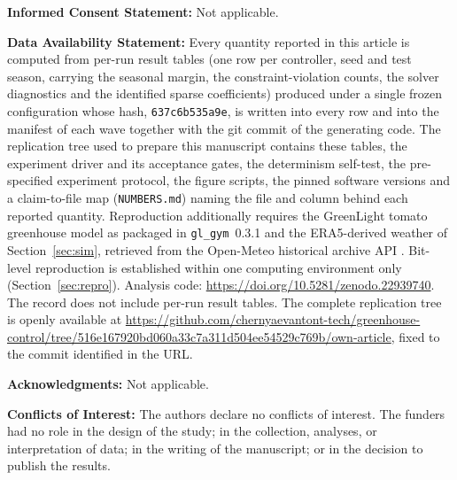 \noindent\textbf{Informed Consent Statement:} Not applicable.

\noindent\textbf{Data Availability Statement:}
Every quantity reported in this article is computed from per-run result tables (one
row per controller, seed and test season, carrying the seasonal margin, the
constraint-violation counts, the solver diagnostics and the identified sparse
coefficients) produced under a single frozen configuration whose hash,
\texttt{637c6b535a9e}, is written into every row and into the manifest of each wave
together with the git commit of the generating code. The replication tree used to prepare this manuscript
contains these tables, the experiment driver and its acceptance gates, the determinism
self-test, the pre-specified experiment protocol, the figure scripts, the pinned software
versions and a claim-to-file map (\texttt{NUMBERS.md}) naming the file and column behind
each reported quantity. Reproduction additionally requires the GreenLight tomato
greenhouse model as packaged in \texttt{gl\_gym}~0.3.1 \cite{katzin2020,vanlaatum2025}
and the ERA5-derived weather of Section~\ref{sec:sim}, retrieved from the Open-Meteo
historical archive API \cite{hersbach2020,openmeteo2023}. Bit-level reproduction is
established within one computing environment only (Section~\ref{sec:repro}).
Analysis code: \url{https://doi.org/10.5281/zenodo.22939740}. The record does not include per-run result tables.
The complete replication tree is openly available at \url{https://github.com/chernyaevantont-tech/greenhouse-control/tree/516e167920bd060a33c7a311d504ee54529c769b/own-article}, fixed to the commit identified in the URL.

\noindent\textbf{Acknowledgments:} Not applicable.

\noindent\textbf{Conflicts of Interest:} The authors declare no conflicts of interest. The funders had no role in the design of the study; in the collection, analyses, or interpretation of data; in the writing of the manuscript; or in the decision to publish the results.

\normalsize
\vspace{0.5\baselineskip}

